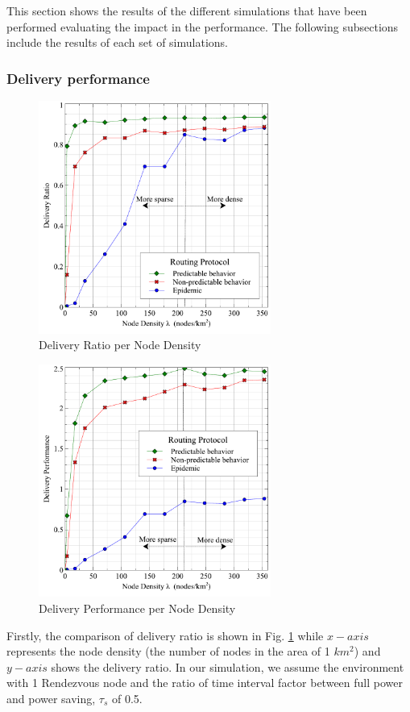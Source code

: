 This section shows the results of the different simulations that have been performed evaluating the impact in the performance.
The following subsections include the results of each set of simulations.

\subsubsection{Delivery performance}

\begin{figure}[!t]
	\centering
	\includegraphics[width=3in]{Graphs/DeliveryRatio.pdf}
	\caption{Delivery Ratio per Node Density}
	\label{Delivery Ratio per Node Density}
\end{figure}

\begin{figure}[!t]
\centering
\includegraphics[width=3in]{Graphs/NetworkPerformance.pdf}
\caption{Delivery Performance per Node Density}
\label{Network Performance per Node Density}
\end{figure}

Firstly, the comparison of delivery ratio is shown in Fig. \ref{Delivery Ratio per Node Density} while $x-axis$ represents the node density (the number of nodes in the area of 1 $km^2$) and $y-axis$ shows the delivery ratio.
In our simulation, we assume the environment with 1 Rendezvous node and the ratio of time interval factor between full power and power saving, $\tau_s$ of 0.5.

